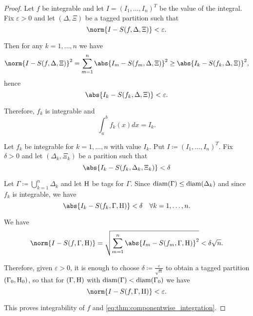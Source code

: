 \begin{proof}
  \SufficiencySubProof Let \( f \) be integrable and let \( I = (I_1, \ldots, I_n)^T \) be the value of the integral. Fix \( \varepsilon > 0 \) and let \( (\Delta, \Xi) \) be a tagged partition such that
  \begin{equation*}
    \norm{I - S(f, \Delta, \Xi)} < \varepsilon.
  \end{equation*}

  Then for any \( k = 1, \ldots, n \) we have
  \begin{equation*}
    \norm{I - S(f, \Delta, \Xi)}^2
    =
    \sum_{m=1}^n \abs{I_m - S(f_m, \Delta, \Xi)}^2
    \geq
    \abs{I_k - S(f_k, \Delta, \Xi)}^2,
  \end{equation*}
  hence
  \begin{equation*}
    \abs{I_k - S(f_k, \Delta, \Xi)} < \varepsilon.
  \end{equation*}

  Therefore, \( f_k \) is integrable and
  \begin{equation*}
    \int_a^b f_k(x) dx = I_k.
  \end{equation*}

  \NecessitySubProof Let \( f_k \) be integrable for \( k = 1, \ldots, n \) with value \( I_k \). Put \( I \coloneqq (I_1, \ldots, I_n)^T \). Fix \( \delta > 0 \) and let \( (\Delta_k, \Xi_k) \) be a parition such that
  \begin{equation*}
    \abs{I_k - S(f_k, \Delta_k, \Xi_k)} < \delta
  \end{equation*}

  Let \( \Gamma \coloneqq \bigcup_{k=1}^n \Delta_k \) and let \( \operatorname{H} \) be tags for \( \Gamma \). Since \( \operatorname{diam}(\Gamma) \leq \operatorname{diam}(\Delta_k) \) and since \( f_k \) is integrable, we have
  \begin{equation*}
    \abs{I_k - S(f_k, \Gamma, \Eta)} < \delta \quad\forall k = 1, \ldots, n.
  \end{equation*}

  We have
  \begin{equation*}
    \norm{I - S(f, \Gamma, \Eta)}
    =
    \sqrt{\sum_{m=1}^n \abs{I_m - S(f_m, \Gamma, \Eta)}^2}
    <
    \delta \sqrt{n}.
  \end{equation*}

  Therefore, given \( \varepsilon > 0 \), it is enough to choose \( \delta \coloneqq \frac {\varepsilon} {\sqrt n} \) to obtain a tagged partition \( (\Gamma_0, \operatorname{H}_0) \), so that for \( (\Gamma, \operatorname{H}) \) with \( \operatorname{diam}(\Gamma) < \operatorname{diam}(\Gamma_0) \) we have
  \begin{equation*}
    \norm{I - S(f, \Gamma, \Eta)} < \varepsilon.
  \end{equation*}

  This proves integrability of \( f \) and \eqref{eq:thm:componentwise_integration}.
\end{proof}
